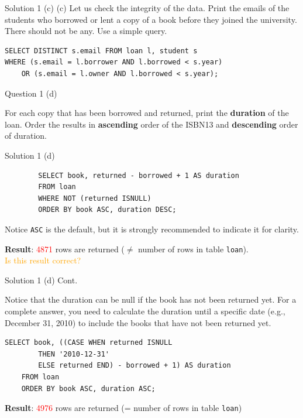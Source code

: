 \begin{frame}[fragile]{Solution 1 (c)}
(c) Let us check the integrity of the data. Print the emails of the students who borrowed or lent a copy of a book before they joined the university. There should not be any. Use a simple query.\\\vspace{10pt}

\begin{lstlisting}
SELECT DISTINCT s.email FROM loan l, student s 
WHERE (s.email = l.borrower AND l.borrowed < s.year) 
	OR (s.email = l.owner AND l.borrowed < s.year);
\end{lstlisting}
\end{frame}


\begin{frame}[fragile]{Question 1 (d)}

For each copy that has been borrowed and returned, print the \textbf{duration} of the loan. Order the results in \textbf{ascending} order of the ISBN13 and \textbf{descending} order of duration.  
\end{frame}

\begin{frame}[fragile]{Solution 1 (d)}

	\begin{lstlisting}
		SELECT book, returned - borrowed + 1 AS duration 
		FROM loan
		WHERE NOT (returned ISNULL)
		ORDER BY book ASC, duration DESC;
	\end{lstlisting}

\begin{alertblock}{Notice}
\texttt{ASC} is the default, but it is strongly recommended to indicate it for clarity.
\end{alertblock}	

\textbf{Result}: \textcolor{red}{4871} rows are returned ($\neq$ number of rows in table \texttt{loan}).\\\vspace{10pt}
\textcolor{orange}{Is this result correct?}
	
\end{frame}

\begin{frame}[fragile]{Solution 1 (d) Cont.}
	
Notice that the duration can be null if the book has not been returned yet. For a complete answer, you need to calculate the duration until a specific date (e.g., December 31, 2010) to include the books that have not been returned yet. \vspace{10pt}
	
\begin{lstlisting}
SELECT book, ((CASE	WHEN returned ISNULL 
		THEN '2010-12-31'
		ELSE returned END) - borrowed + 1) AS duration 
	FROM loan
	ORDER BY book ASC, duration ASC;
\end{lstlisting}
\vspace{10pt}
 
\textbf{Result}: \textcolor{red}{4976} rows are returned (= number of rows in table \texttt{loan})
\end{frame}


